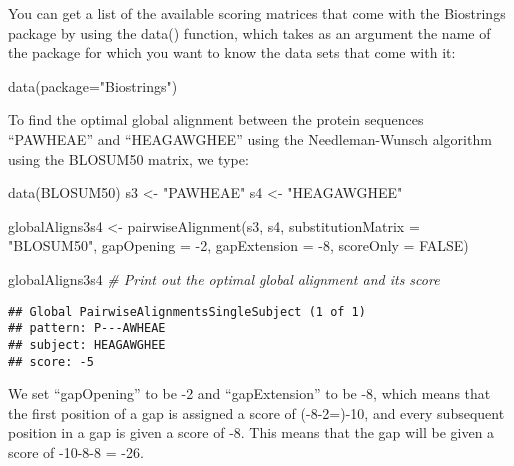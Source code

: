 \documentclass[
]{book}
\newenvironment{Shaded}{\begin{snugshade}}{\end{snugshade}}
\newcommand{\AttributeTok}[1]{\textcolor[rgb]{0.77,0.63,0.00}{#1}}
\newcommand{\CommentTok}[1]{\textcolor[rgb]{0.56,0.35,0.01}{\textit{#1}}}
\newcommand{\ConstantTok}[1]{\textcolor[rgb]{0.00,0.00,0.00}{#1}}
\newcommand{\DecValTok}[1]{\textcolor[rgb]{0.00,0.00,0.81}{#1}}
\newcommand{\FunctionTok}[1]{\textcolor[rgb]{0.00,0.00,0.00}{#1}}
\newcommand{\NormalTok}[1]{#1}
\newcommand{\OtherTok}[1]{\textcolor[rgb]{0.56,0.35,0.01}{#1}}
\newcommand{\SpecialCharTok}[1]{\textcolor[rgb]{0.00,0.00,0.00}{#1}}
\newcommand{\StringTok}[1]{\textcolor[rgb]{0.31,0.60,0.02}{#1}}
\begin{document}
You can get a list of the available scoring matrices that come with the Biostrings package by using the data() function, which takes as an argument the name of the package for which you want to know the data sets that come with it:

\begin{Shaded}
\begin{Highlighting}[]
\FunctionTok{data}\NormalTok{(}\AttributeTok{package=}\StringTok{"Biostrings"}\NormalTok{)}
\end{Highlighting}
\end{Shaded}

To find the optimal global alignment between the protein sequences ``PAWHEAE'' and ``HEAGAWGHEE'' using the Needleman-Wunsch algorithm using the BLOSUM50 matrix, we type:

\begin{Shaded}
\begin{Highlighting}[]
\FunctionTok{data}\NormalTok{(BLOSUM50)}
\NormalTok{s3 }\OtherTok{\textless{}{-}} \StringTok{"PAWHEAE"}
\NormalTok{s4 }\OtherTok{\textless{}{-}} \StringTok{"HEAGAWGHEE"}
\end{Highlighting}
\end{Shaded}

\begin{Shaded}
\begin{Highlighting}[]
\NormalTok{globalAligns3s4 }\OtherTok{\textless{}{-}} \FunctionTok{pairwiseAlignment}\NormalTok{(s3, s4, }\AttributeTok{substitutionMatrix =} \StringTok{"BLOSUM50"}\NormalTok{, }\AttributeTok{gapOpening =} \SpecialCharTok{{-}}\DecValTok{2}\NormalTok{,}
\AttributeTok{gapExtension =} \SpecialCharTok{{-}}\DecValTok{8}\NormalTok{, }\AttributeTok{scoreOnly =} \ConstantTok{FALSE}\NormalTok{)}
\end{Highlighting}
\end{Shaded}

\begin{Shaded}
\begin{Highlighting}[]
\NormalTok{globalAligns3s4 }\CommentTok{\# Print out the optimal global alignment and its score}
\end{Highlighting}
\end{Shaded}

\begin{verbatim}
## Global PairwiseAlignmentsSingleSubject (1 of 1)
## pattern: P---AWHEAE
## subject: HEAGAWGHEE
## score: -5
\end{verbatim}

We set ``gapOpening'' to be -2 and ``gapExtension'' to be -8, which means that the first position of a gap is assigned a score of (-8-2=)-10, and every subsequent position in a gap is given a score of -8. This means that the gap will be given a score of -10-8-8 = -26.
\end{document}
